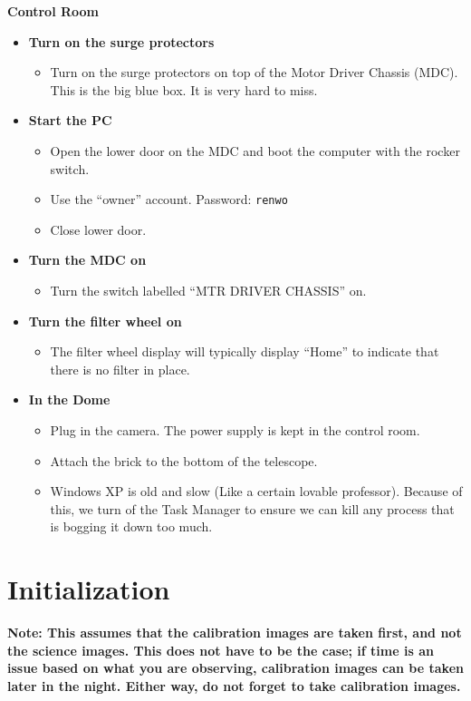 \documentclass[letterpaper, 12pt]{report}
\begin{document}
{\large\textbf{Control Room}}
\begin{itemize}
	\item \textbf{Turn on the surge protectors}
	\begin{itemize}
		\item Turn on the surge protectors on top of the Motor Driver Chassis (MDC). This is the big blue box. It is very hard to miss.
	\end{itemize}
	\item \textbf{Start the PC}
	\begin{itemize}
		\item Open the lower door on the MDC and boot the computer with the rocker switch.
		\item Use the ``owner'' account. Password: \texttt{renwo}
		\item Close lower door.
	\end{itemize}
	\item \textbf{Turn the MDC on}
	\begin{itemize}
		\item Turn the switch labelled ``MTR DRIVER CHASSIS'' on.
	\end{itemize}
	\item \textbf{Turn the filter wheel on}
	\begin{itemize}
		\item The filter wheel display will typically display ``Home'' to indicate that there is no filter in place.
	\end{itemize}
	\item \textbf{In the Dome}
	\begin{itemize}
		\item Plug in the camera. The power supply is kept in the control room.
		\item Attach the brick to the bottom of the telescope.
	\end{itemize}
	\begin{itemize}
		\item Windows XP is old and slow (Like a certain lovable professor). Because of this, we turn of the Task Manager to ensure we can kill any process that is bogging it down too much.
	\end{itemize}
\end{itemize}

\newpage



\chapter{Initialization}\label{ch:initialization}
\textbf{Note: This assumes that the calibration images are taken first, and not the science images. This does not have to be the case; if time is an issue based on what you are observing, calibration images can be taken later in the night. Either way, do not forget to take calibration images.} \\
\end{document}
